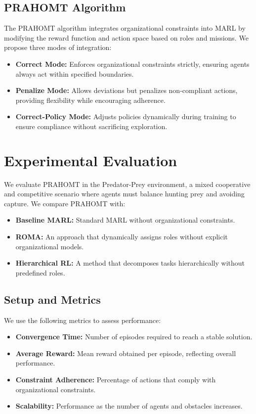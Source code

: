 \documentclass[sigconf,anonymous]{aamas}
\begin{document}
\subsection{PRAHOMT Algorithm}
The PRAHOMT algorithm integrates organizational constraints into MARL by modifying the reward function and action space based on roles and missions. We propose three modes of integration:
\begin{itemize}
    \item \textbf{Correct Mode:} Enforces organizational constraints strictly, ensuring agents always act within specified boundaries.
    \item \textbf{Penalize Mode:} Allows deviations but penalizes non-compliant actions, providing flexibility while encouraging adherence.
    \item \textbf{Correct-Policy Mode:} Adjusts policies dynamically during training to ensure compliance without sacrificing exploration.
\end{itemize}

\section{Experimental Evaluation}
\label{sec:experiments}
We evaluate PRAHOMT in the Predator-Prey environment, a mixed cooperative and competitive scenario where agents must balance hunting prey and avoiding capture. We compare PRAHOMT with:
\begin{itemize}
    \item \textbf{Baseline MARL:} Standard MARL without organizational constraints.
    \item \textbf{ROMA:} An approach that dynamically assigns roles without explicit organizational models.
    \item \textbf{Hierarchical RL:} A method that decomposes tasks hierarchically without predefined roles.
\end{itemize}

\subsection{Setup and Metrics}
We use the following metrics to assess performance:
\begin{itemize}
    \item \textbf{Convergence Time:} Number of episodes required to reach a stable solution.
    \item \textbf{Average Reward:} Mean reward obtained per episode, reflecting overall performance.
    \item \textbf{Constraint Adherence:} Percentage of actions that comply with organizational constraints.
    \item \textbf{Scalability:} Performance as the number of agents and obstacles increases.
\end{itemize}
\end{document}
